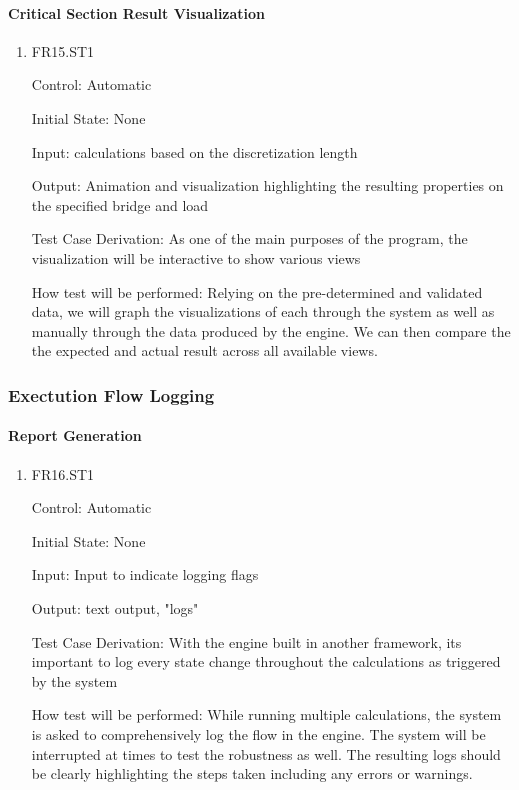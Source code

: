 \documentclass[12pt, titlepage]{article}
\begin{document}
\paragraph{Critical Section Result Visualization}

\begin{enumerate}

\item{FR15.ST1\\}

Control: Automatic
					
Initial State: None
					
Input: calculations based on the discretization length 
					
Output:  Animation and visualization highlighting the resulting properties on the specified bridge and load 

Test Case Derivation: As one of the main purposes of the program, the visualization will be interactive to show various views

How test will be performed: Relying on the pre-determined and validated data, we will graph the visualizations of each through the system as well as manually through the data produced by the engine. We can then compare the the expected and actual result across all available views. 

\end{enumerate}

\subsubsection{Exectution Flow Logging}

\paragraph{Report Generation}

\begin{enumerate}

\item{FR16.ST1\\}

Control: Automatic
					
Initial State: None
					
Input: Input to indicate logging flags 
					
Output: text output, "logs"

Test Case Derivation: With the engine built in another framework, its important to log every state change throughout the calculations as triggered by the system

How test will be performed: While running multiple calculations, the system is asked to comprehensively log the flow in the engine. The system will be interrupted at times to test the robustness as well. The resulting logs should be clearly highlighting the steps taken including any errors or warnings.
					
\end{enumerate}
\end{document}
